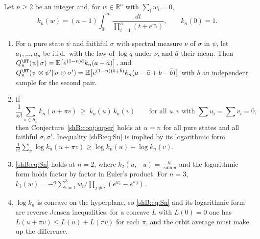 \begin{proposition}\label{shB:prop:integer}
Let $n\ge2$ be an integer and, for $w\in\mathbb R^n$ with $\sum_iw_i=0$,
\[
k_n(w)=(n-1)\int_0^\infty\frac{dt}{\prod_{i=1}^n(t+e^{w_i})},\qquad k_n(0)=1 .
\]
\begin{enumerate}[label=(\alph*)]
\item For a pure state $\psi$ and faithful $\sigma$ with spectral measure $\nu$ of $\sigma$ in $\psi$, let $a_1,\dots,a_n$ be i.i.d.\ with the law of $\log q$ under $\nu$, and $\bar a$ their mean. Then $Q^\HT_n(\psi\|\sigma)=\mathbb E\big[e^{(1-n)\bar a}k_n(a-\bar a)\big]$, and $Q^\HT_n(\psi\otimes\psi'\|\sigma\otimes\sigma')=\mathbb E\big[e^{(1-n)(\bar a+\bar b)}k_n(a-\bar a+b-\bar b)\big]$ with $b$ an independent sample for the second pair.
\item If
\begin{equation}\label{shB:eq:Sn}
\frac1{n!}\sum_{\pi\in S_n}k_n(u+\pi v)\ \ge\ k_n(u)\,k_n(v)\qquad\text{for all }u,v\text{ with }\textstyle\sum u_i=\sum v_i=0,
\end{equation}
then Conjecture~\ref{shB:conj:super} holds at $\alpha=n$ for all pure states and all faithful $\sigma,\sigma'$. Inequality \eqref{shB:eq:Sn} is implied by its logarithmic form $\frac1{n!}\sum_\pi\log k_n(u+\pi v)\ge\log k_n(u)+\log k_n(v)$.
\item \eqref{shB:eq:Sn} holds at $n=2$, where $k_2(u,-u)=\frac{u}{\sinh u}$ and the logarithmic form holds factor by factor in Euler's product. For $n=3$, $k_3(w)=-2\sum_{i=1}^3w_i\big/\prod_{j\ne i}(e^{w_i}-e^{w_j})$.
\item $\log k_n$ is concave on the hyperplane, so \eqref{shB:eq:Sn} and its logarithmic form are reverse Jensen inequalities: for a concave $L$ with $L(0)=0$ one has $L(u+\pi v)\le L(u)+L(\pi v)$ for each $\pi$, and the orbit average must make up the difference.
\end{enumerate}
\end{proposition}


